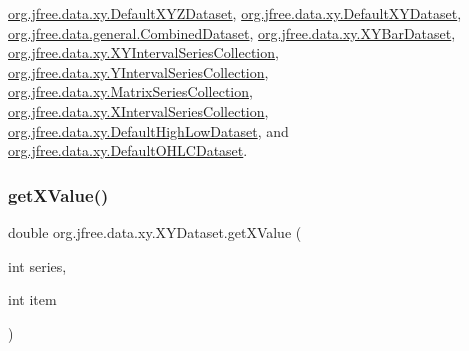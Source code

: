 \mbox{\hyperlink{classorg_1_1jfree_1_1data_1_1xy_1_1_default_x_y_z_dataset_a46a17db4f8c6013a1ff779529478c221}{org.\+jfree.\+data.\+xy.\+Default\+X\+Y\+Z\+Dataset}}, \mbox{\hyperlink{classorg_1_1jfree_1_1data_1_1xy_1_1_default_x_y_dataset_ab501c39779d3289533248c8c40a18c1d}{org.\+jfree.\+data.\+xy.\+Default\+X\+Y\+Dataset}}, \mbox{\hyperlink{classorg_1_1jfree_1_1data_1_1general_1_1_combined_dataset_ac323284fc0d4b04b2e725324c477fbe7}{org.\+jfree.\+data.\+general.\+Combined\+Dataset}}, \mbox{\hyperlink{classorg_1_1jfree_1_1data_1_1xy_1_1_x_y_bar_dataset_a517abc432ea872cbd470288b17725337}{org.\+jfree.\+data.\+xy.\+X\+Y\+Bar\+Dataset}}, \mbox{\hyperlink{classorg_1_1jfree_1_1data_1_1xy_1_1_x_y_interval_series_collection_a0abae4cd2bcaab48244751b896c0ee5d}{org.\+jfree.\+data.\+xy.\+X\+Y\+Interval\+Series\+Collection}}, \mbox{\hyperlink{classorg_1_1jfree_1_1data_1_1xy_1_1_y_interval_series_collection_aea821e6f7de4ea55e3ebf533ae124c10}{org.\+jfree.\+data.\+xy.\+Y\+Interval\+Series\+Collection}}, \mbox{\hyperlink{classorg_1_1jfree_1_1data_1_1xy_1_1_matrix_series_collection_a3fbbf6d5deb2ec56a7778c3053da5ead}{org.\+jfree.\+data.\+xy.\+Matrix\+Series\+Collection}}, \mbox{\hyperlink{classorg_1_1jfree_1_1data_1_1xy_1_1_x_interval_series_collection_a2af637ee9454c9b23c9c61e6716eb01d}{org.\+jfree.\+data.\+xy.\+X\+Interval\+Series\+Collection}}, \mbox{\hyperlink{classorg_1_1jfree_1_1data_1_1xy_1_1_default_high_low_dataset_aa55b6574aaf34207a1a53e6bd8e422ea}{org.\+jfree.\+data.\+xy.\+Default\+High\+Low\+Dataset}}, and \mbox{\hyperlink{classorg_1_1jfree_1_1data_1_1xy_1_1_default_o_h_l_c_dataset_aeb1a869407d3258cca101ad2408ad17c}{org.\+jfree.\+data.\+xy.\+Default\+O\+H\+L\+C\+Dataset}}.

\mbox{\label{interfaceorg_1_1jfree_1_1data_1_1xy_1_1_x_y_dataset_a65bd212539d8f7dfb3d3d36b5f42e083}} 
\subsubsection{\texorpdfstring{get\+X\+Value()}{getXValue()}}
{\footnotesize\ttfamily double org.\+jfree.\+data.\+xy.\+X\+Y\+Dataset.\+get\+X\+Value (\begin{DoxyParamCaption}\item[{int}]{series,  }\item[{int}]{item }\end{DoxyParamCaption})}

